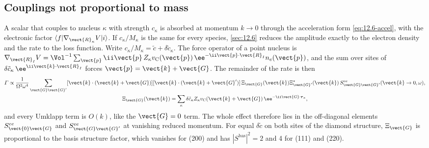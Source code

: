 \subsection{Couplings not proportional to mass}

A scalar that couples to nucleus $\kappa$ with strength $c_\kappa$ is absorbed at momentum $k \to 0$ through the acceleration form \cref{eq:12.6-accel}, with the electronic factor $\langle f|\nabla_{\vect{R}_\kappa}V|i\rangle$. If $c_\kappa/M_\kappa$ is the same for every species, \cref{sec:12.6} reduces the amplitude exactly to the electron density and the rate to the loss function. Write $c_\kappa/M_\kappa = \tilde c + \delta\tilde c_\kappa$. The force operator of a point nucleus is $\nabla_{\vect{R}_I}V = \Vol^{-1}\sum_{\vect{p}}\ii\vect{p}\,Z_\kappa v_{\mathrm{C}}(\vect{p})\,\ee^{-\ii\vect{p}\cdot\vect{R}_I}n_e(\vect{p})$, and the sum over sites of $\delta\tilde c_\kappa\,\ee^{\ii\vect{k}\cdot\vect{R}_I}$ forces $\vect{p} = \vect{k} + \vect{G}$. The remainder of the rate is then
\begin{equation}
  \begin{gathered}
  \varGamma \propto \frac{1}{\Omega^2\omega^4}\sum_{\vect{G}\vect{G}'}[\vect{k}\cdot(\vect{k}+\vect{G})][\vect{k}\cdot(\vect{k}+\vect{G}')]\,
  \Xi_{\vect{G}}(\vect{k})\Xi^*_{\vect{G}'}(\vect{k})\,S^{ee}_{\vect{G}\vect{G}'}(\vect{k}\to0,\omega) ,
  \\
  \Xi_{\vect{G}}(\vect{k}) = \sum_\kappa \delta\tilde c_\kappa Z_\kappa v_{\mathrm{C}}(\vect{k}+\vect{G})\,\ee^{-\ii\vect{G}\cdot\boldsymbol{\tau}_\kappa} ,
  \end{gathered}
  \label{eq:E.18-X}
\end{equation}
and every Umklapp term is $O(k)$, like the $\vect{G} = 0$ term. The whole effect therefore lies in the off-diagonal elements $S^{ee}_{\vect{0}\vect{G}}$ and $S^{ee}_{\vect{G}\vect{G}'}$ at vanishing reduced momentum. For equal $\delta\tilde c$ on both sites of the diamond structure, $\Xi_{\vect{G}}$ is proportional to the basis structure factor, which vanishes for (200) and has $|S^{\mathrm{bas}}|^2 = 2$ and 4 for (111) and (220).

